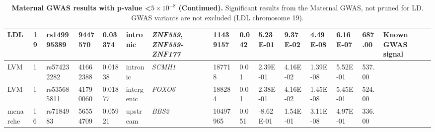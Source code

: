 \begin{landscape}
\begin{table}
\begin{adjustbox}{max width=\linewidth}
\begin{tabular}{@{}p{2cm}|p{0.5cm}p{2cm}p{2cm}p{1.5cm}p{3cm}p{2.5cm}p{1.5cm}p{1cm}p{2cm}p{2cm}p{2cm}p{2cm}p{1.5cm}p{4cm}@{}}
LDL&19&rs149995389&9447570&0.03374&intronic&\emph{ZNF559}, \emph{ZNF559-ZNF177}&11439157&0.042&5.23E-01&9.37E-02&4.49E-08&6.16E-07&687.00&Known GWAS signal\\ \hline
LVM&1&rs574232282&41662388&0.01838&intronic&\emph{SCMH1}&187718&0.01&2.39E-01&4.16E-02&1.39E-08&5.52E-01&537.00&\\ \hline
LVM&1&rs535685811&41790060&0.01877&intergenic&\emph{FOXO6}&188284&0.01&2.38E-01&4.16E-02&1.45E-08&5.45E-01&524.00&\\ \hline
menarche&16&rs7184983&56554709&0.05921&upstream&\emph{BBS2}&10497965&0.051&-8.62E-01&1.54E-01&3.11E-08&4.97E-01&336.00&\\ \bottomrule
\end{tabular}
\end{adjustbox}
\caption[Maternal GWAS results with p-value \textless $5 \times 10^{-8}$ (Continued). ]{\textbf{Maternal GWAS results with p-value \textless $5 \times 10^{-8}$ (Continued).} Significant results from the Maternal GWAS, not pruned for LD. GWAS variants are not excluded (LDL chromosome 19).  }
\label{tab:tab-s5b}
\end{table}





\end{landscape}
